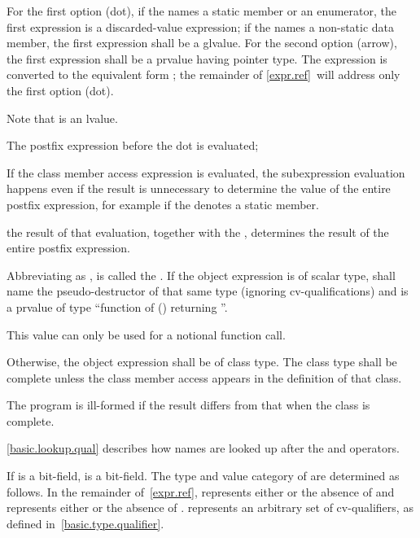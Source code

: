 \pnum
{}%
For the first option (dot),
if the  names a static member or an enumerator,
the first expression is a discarded-value expression;
if the  names a non-static data member,
the first expression shall be a glvalue.
For the second option (arrow), the first expression
shall be a prvalue having pointer type.
The expression  is
converted to the equivalent form ; the remainder of
\ref{expr.ref}~will address only the first option (dot).
\begin{footnote}
Note that
 is an lvalue.
\end{footnote}

\pnum
The postfix expression before the dot is evaluated;
\begin{footnote}
If the class member
access expression is evaluated, the subexpression evaluation happens even if the
result is unnecessary to determine
the value of the entire postfix expression, for example if the
 denotes a static member.
\end{footnote}
the result of that evaluation,
together with the ,
determines the result of the entire postfix expression.

\pnum
Abbreviating
as ,  is called the .
If the object expression is of scalar type,
 shall name the pseudo-destructor
of that same type (ignoring cv-qualifications) and
 is a prvalue of type ``function of () returning ''.
\begin{note}
This value can only be used
for a notional function call.
\end{note}

\pnum
Otherwise, the object expression shall be of class type.
The class type shall be complete
unless the class member access appears in the definition of that class.
\begin{note}
The program is ill-formed if the result differs from that
when the class is complete.
\end{note}
\begin{note}
\ref{basic.lookup.qual} describes how names are looked up after the
 and \tcode{->} operators.
\end{note}

\pnum
If  is a bit-field,  is a bit-field. The
type and value category of  are determined as follows.
In the remainder of~\ref{expr.ref},  represents either
 or the absence of  and  represents
either  or the absence of . 
represents an arbitrary set of cv-qualifiers, as defined
in~\ref{basic.type.qualifier}.

